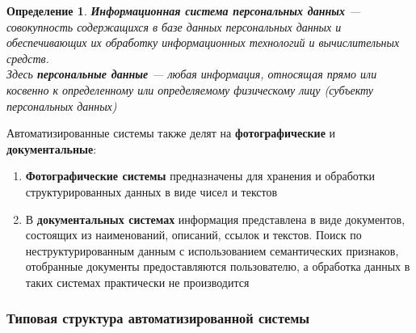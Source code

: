 \documentclass{article}
\newtheorem{definition}{Определение}
\begin{document}
\begin{definition}

\textbf{Информационная система персональных данных} — совокупность содержащихся в базе данных персональных данных и обеспечивающих их обработку информационных технологий и вычислительных средств. \\[1mm]

Здесь \textbf{персональные данные} — любая информация, относящая прямо или косвенно к определенному или определяемому физическому лицу (субъекту персональных данных)

\end{definition}

Автоматизированные системы также делят на \textbf{фотографические} и \textbf{документальные}:

\begin{enumerate}
    \item \textbf{Фотографические системы} предназначены для хранения и обработки структурированных данных в виде чисел и текстов
    \item В \textbf{документальных системах} информация представлена в виде документов, состоящих из наименований, описаний, ссылок и текстов. Поиск по неструктурированным данным с использованием семантических признаков, отобранные документы предоставляются пользователю, а обработка данных в таких системах практически не производится
\end{enumerate}

\subsubsection{Типовая структура автоматизированной системы}
\end{document}
